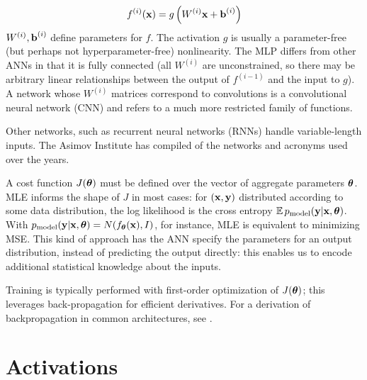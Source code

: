 \documentclass{article}
\begin{document}
$$
f^{(i)}(\textbf{x})=g\left({W^{(i)}\textbf{x}+\textbf{b}^{(i)}}\right)
$$
$W^{(i)},\textbf{b}^{(i)}$ define parameters for $f$. The activation $g$ is usually a parameter-free (but perhaps not hyperparameter-free) nonlinearity. The MLP differs from other ANNs in that it is fully connected (all $W^{(i)}$ are unconstrained, so there may be arbitrary linear relationships between the output of $f^{(i-1)}$ and the input to $g$). A network whose $W^{(i)}$ matrices correspond to convolutions is a convolutional neural network (CNN) and refers to a much more restricted family of functions.

Other networks, such as recurrent neural networks (RNNs) handle variable-length inputs. The Asimov Institute has compiled  of the networks and acronyms used over the years.

A cost function $J({\boldsymbol\theta})$ must be defined over the vector of aggregate parameters ${\boldsymbol\theta}$. MLE informs the shape of $J$ in most cases: for $(\textbf{x},\textbf{y})$ distributed according to some data distribution, the log likelihood is the cross entropy $\operatorname{\mathbb{E}} p_\text{model}(\textbf{y}|\textbf{x},{\boldsymbol\theta})$. With $p_\text{model}(\textbf{y}|\textbf{x},{\boldsymbol\theta})=N(f_{\boldsymbol\theta}(\textbf{x}),I)$, for instance, MLE is equivalent to minimizing MSE. This kind of approach has the ANN specify the parameters for an output distribution, instead of predicting the output directly: this enables us to encode additional statistical knowledge about the inputs.

Training is typically performed with first-order optimization of $J({\boldsymbol\theta})$; this leverages back-propagation for efficient derivatives. For a derivation of backpropagation in common architectures, see .

\section{Activations}
\end{document}
